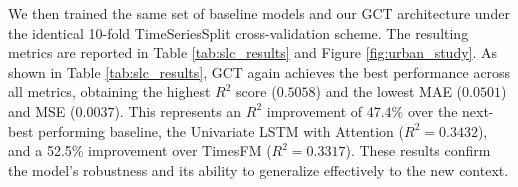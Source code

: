 \documentclass[acmsmall]{acmart}
\begin{document}
{We then trained the same set of baseline models and our GCT {\color{blue}architecture} under the identical 10-fold TimeSeriesSplit cross-validation scheme. The resulting metrics are reported in Table \ref{tab:slc_results} and Figure \ref{fig:urban_study}. As shown in Table \ref{tab:slc_results}, GCT again achieves the best performance across all metrics, obtaining the highest $R^2$ score ($0.5058$) and the lowest MAE ($0.0501$) and MSE ($0.0037$). This represents an $R^2$ improvement of 47.4\% over the next-best performing baseline, the Univariate LSTM with Attention ($R^2=0.3432$), and a 52.5\% improvement over TimesFM ($R^2=0.3317$). These results confirm the model's robustness and its ability to generalize effectively to the new context.
}


\begin{table}[ht]
\centering
\footnotesize
{}
\end{table}
\end{document}

